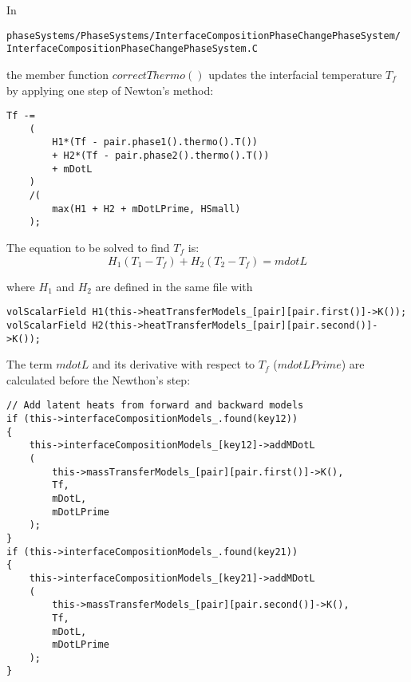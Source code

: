 \documentclass[]{report}
\title{}
\author{}
\begin{document}
\maketitle

\begin{abstract}
\end{abstract}
In 
\begin{verbatim}
phaseSystems/PhaseSystems/InterfaceCompositionPhaseChangePhaseSystem/
InterfaceCompositionPhaseChangePhaseSystem.C 
\end{verbatim}

the member function $correctThermo()$ updates the interfacial temperature $T_f$ by applying one step of Newton's method:
\begin{verbatim}
Tf -=
	(
        H1*(Tf - pair.phase1().thermo().T())
        + H2*(Tf - pair.phase2().thermo().T())
        + mDotL
    )
    /(
        max(H1 + H2 + mDotLPrime, HSmall)
    );
\end{verbatim}

The equation to be solved to find $T_f$ is:
\begin{equation}
H_1(T_1-T_f)+H_2(T_2-T_f)= mdotL
\end{equation}

where $H_1$ and $H_2$ are defined in the same file with
\begin{verbatim}
volScalarField H1(this->heatTransferModels_[pair][pair.first()]->K());
volScalarField H2(this->heatTransferModels_[pair][pair.second()]->K());
\end{verbatim}

The term $mdotL$ and its derivative with respect to $T_f$ ($mdotLPrime$) are calculated before the Newthon's step:
\begin{verbatim}
// Add latent heats from forward and backward models
if (this->interfaceCompositionModels_.found(key12))
{
    this->interfaceCompositionModels_[key12]->addMDotL
    (
        this->massTransferModels_[pair][pair.first()]->K(),
        Tf,
        mDotL,
        mDotLPrime
    );
}
if (this->interfaceCompositionModels_.found(key21))
{
    this->interfaceCompositionModels_[key21]->addMDotL
    (
        this->massTransferModels_[pair][pair.second()]->K(),
        Tf,
        mDotL, 
        mDotLPrime
    );
}
\end{verbatim}
\end{document}
